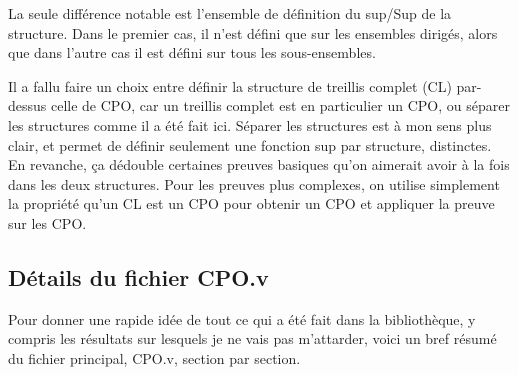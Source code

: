 \documentclass{article}
\newcommand\code[1]{{\fontfamily{lmtt}\selectfont #1}}
\theoremstyle{definition}
\begin{document}
La seule différence notable est l'ensemble de définition du sup/Sup de la structure. Dans le premier cas, il n'est défini que sur les ensembles dirigés, alors que dans l'autre cas il est défini sur tous les sous-ensembles. 

Il a fallu faire un choix entre définir la structure de treillis complet (CL) par-dessus celle de CPO, car un treillis complet est en particulier un CPO, ou séparer les structures comme il a été fait ici. Séparer les structures est à mon sens plus clair, et permet de définir seulement une fonction sup par structure, distinctes. En revanche, ça dédouble certaines preuves basiques qu'on aimerait avoir à la fois dans les deux structures. Pour les preuves plus complexes, on utilise simplement la propriété qu'un CL est un CPO pour obtenir un CPO et appliquer la preuve sur les CPO.



\subsection{Détails du fichier CPO.v}

Pour donner une rapide idée de tout ce qui a été fait dans la bibliothèque, y compris les résultats sur lesquels je ne vais pas m'attarder, voici un bref résumé du fichier principal, \code{CPO.v}, section par section.

\medskip
\end{document}
